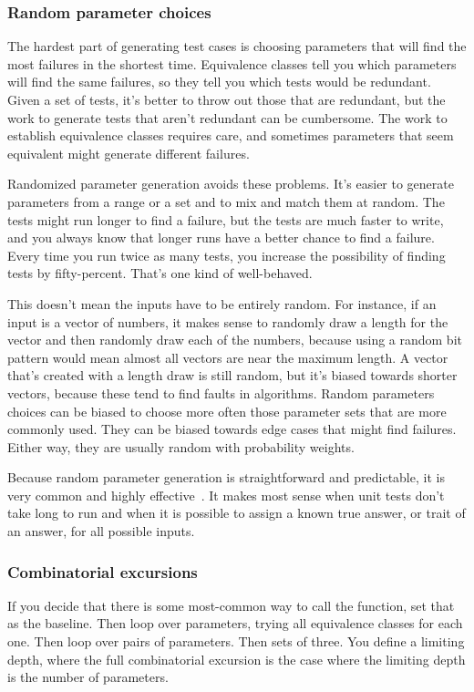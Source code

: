 \documentclass[fleqn,10pt]{olplainarticle}
\begin{document}
\subsubsection{Random parameter choices}

The hardest part of generating test cases is choosing parameters
that will find the most failures in the shortest time. Equivalence
classes tell you which parameters will find the same failures,
so they tell you which tests would be redundant. Given a set
of tests, it's better to throw out those that are redundant,
but the work to generate tests that aren't redundant can be cumbersome.
The work to establish equivalence classes requires care,
and sometimes parameters that seem equivalent might generate
different failures.

Randomized parameter generation avoids these problems. It's easier
to generate parameters from a range or a set and to mix and match
them at random. The tests might run longer to find a failure, but
the tests are much faster to write, and you always know that longer
runs have a better chance to find a failure. Every time you
run twice as many tests, you increase the possibility of finding
tests by fifty-percent. That's one kind of well-behaved.

This doesn't mean the inputs have to be entirely random. For
instance, if an input is a vector of numbers, it makes sense
to randomly draw a length for the vector and then randomly
draw each of the numbers, because using a random bit pattern
would mean almost all vectors are near the maximum length.
A vector that's created with a length draw is still random,
but it's biased towards shorter vectors, because these tend
to find faults in algorithms.
Random parameters choices can be biased to choose more often
those parameter sets that are more commonly used. They can
be biased towards edge cases that might find failures. Either way,
they are usually random with probability weights.

Because random parameter generation is straightforward
and predictable, it is very common and highly effective~\citep{arcuri2011random}.
It makes most sense when unit tests don't take long to run
and when it is possible to assign a known true answer, or trait
of an answer, for all possible inputs.


\subsubsection{Combinatorial excursions}
If you decide that there is some most-common way to call
the function, set that as the baseline. Then loop over parameters,
trying all equivalence classes for each one. Then loop over pairs of parameters. Then sets of three. You define a limiting depth,
where the full combinatorial excursion is the case where the
limiting depth is the number of parameters.
\end{document}
